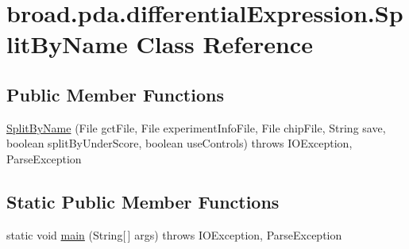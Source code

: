\hypertarget{classbroad_1_1pda_1_1differential_expression_1_1_split_by_name}{\section{broad.\+pda.\+differential\+Expression.\+Split\+By\+Name Class Reference}
\label{classbroad_1_1pda_1_1differential_expression_1_1_split_by_name}
}
\subsection*{Public Member Functions}
\begin{DoxyCompactItemize}
\item 
\hyperlink{classbroad_1_1pda_1_1differential_expression_1_1_split_by_name_a00d4edf89e9f064f975ad0baa59e3c32}{Split\+By\+Name} (File gct\+File, File experiment\+Info\+File, File chip\+File, String save, boolean split\+By\+Under\+Score, boolean use\+Controls)  throws I\+O\+Exception, Parse\+Exception
\end{DoxyCompactItemize}
\subsection*{Static Public Member Functions}
\begin{DoxyCompactItemize}
\item 
static void \hyperlink{classbroad_1_1pda_1_1differential_expression_1_1_split_by_name_a83af777ccae0b3a6e67a0c3785e59f87}{main} (String\mbox{[}$\,$\mbox{]} args)  throws I\+O\+Exception, Parse\+Exception
\end{DoxyCompactItemize}


